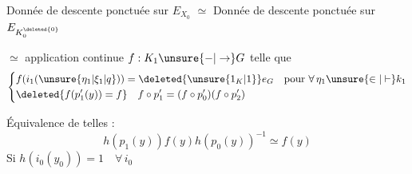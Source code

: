 Donnée de descente  ponctuée sur $E_{X_0}$ $\simeq$ Donnée de descente ponctuée  sur $E_{K^{\deleted{0}}_0}$

$\simeq$ application continue $f:K_1\unsure{\mathbin{-}|\to}G$ telle que
\[
\left\{\begin{aligned}
&f(i_1(\unsure{\eta_1|\xi_1|q}))=\deleted{\unsure{1_K|1}}e_G\quad\text{pour }\forall\,\eta_1\unsure{\in|\vdash} k_1\\
&\deleted{f(p'_1(y))=f}\quad f\circ p'_1=(f\circ p'_0)(f\circ p'_2)
\end{aligned}\right.
\]

Équivalence de telles : 
\[
h(p_1(y))f(y)h(p_0(y))^{-1}\simeq f(y)
\]
Si \quad $h(i_0(y_0))=1\quad\forall\,i_0$


